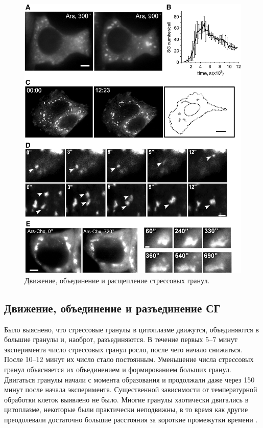 \documentclass[14pt,a4paper]{extarticle}
\begin{document}
\begin{figure}[htb]\centering
\includegraphics[width=\columnwidth]{../pics/0.jpg}
\caption{Движение, объединение и расщепление стрессовых гранул.}
\end{figure}


\subsection{Движение, объединение и разъединение СГ}
	 Было выяснено, что стрессовые гранулы в цитоплазме движутся, объединяются в большие гранулы и, наоброт, разъединяются. В течение первых 5--7 минут эксперимента число стрессовых гранул росло, после чего начало снижаться. После 10--12 минут их число стало постоянным. Уменьшение числа стрессовых гранул объясняется их объединением и формированием больших гранул. Двигаться гранулы начали с момента образования и продолжали даже через 150 минут после начала эксперимента. Существенной зависимости от температурной обработки клеток выявлено не было. Многие гранулы хаотически двигались в цитоплазме, некоторые были практически неподвижны, в то время как другие преодолевали достаточно большие расстояния за короткие промежутки времени \cite{Sheetz:1999uq}.
	 
\end{document}
